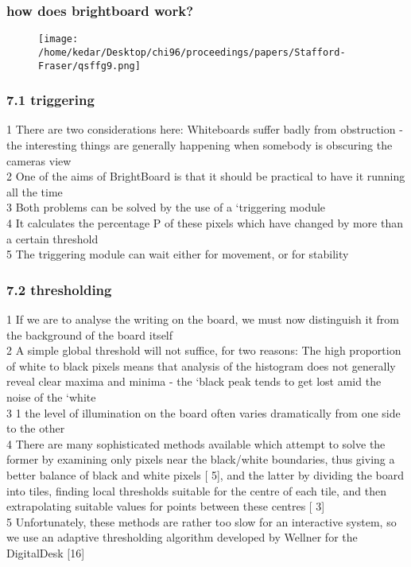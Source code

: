 \documentclass{beamer}
\begin{document}
\begin{frame}
\frametitle{how does brightboard work?}
\begin{figure}\texttt{[image: /home/kedar/Desktop/chi96/proceedings/papers/Stafford-Fraser/qsffg9.png]}\end{figure}\end{frame}
\begin{frame}
\frametitle{7.1 triggering}
1  There are two considerations here:          Whiteboards suffer badly from obstruction - the interesting things are generally happening when somebody is obscuring the cameras view \\2        One of the aims of BrightBoard is that it should be practical to have it running all the time \\3     Both problems can be solved by the use of a `triggering module \\4  It calculates the percentage    P of these pixels which have changed by more than a certain threshold \\5      The triggering module can wait either for movement, or for stability \\
\end{frame}
\begin{frame}
\frametitle{7.2 thresholding}
1  If we are to analyse the writing on the board, we must now distinguish it from the background of the board itself \\2  A simple global threshold will not suffice, for two reasons:          The high proportion of white to black pixels means that analysis of the histogram does not generally reveal clear maxima and minima - the `black peak tends to get lost amid the noise of the `white \\3  1       the level of illumination on the board often varies dramatically from one side to the other \\4     There are many sophisticated methods available which attempt to solve the former by examining only pixels near the black/white boundaries, thus giving a better balance of black and white pixels [    5], and the latter by dividing the board into tiles, finding local thresholds suitable for the centre of each tile, and then extrapolating suitable values for points between these centres [    3] \\5      Unfortunately, these methods are rather too slow for an interactive system, so we use an adaptive thresholding algorithm developed by Wellner for the DigitalDesk [16] \\
\end{frame}
\end{document}

